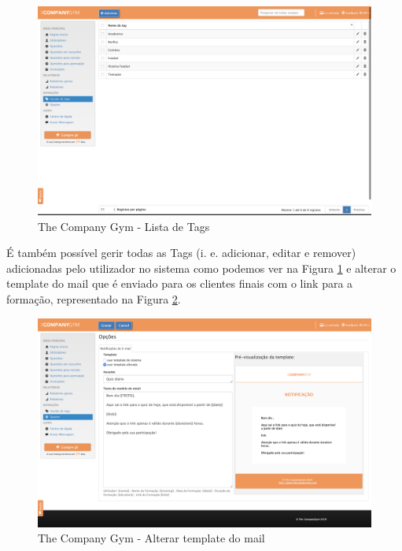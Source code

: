 \newpage


\begin{figure}[ht!]
	\begin{center}
		\includegraphics[width=1\textwidth]{img/tcg/tcg-tags.png}
		\caption{The Company Gym - Lista de Tags}
		\label{fig:tcg-tags}
	\end{center}
\end{figure}

É também possível gerir todas as Tags (i. e. adicionar, editar e remover) adicionadas pelo utilizador no sistema como podemos ver na Figura \ref{fig:tcg-tags} e alterar o template do mail que é enviado para os clientes finais com o link para a formação, representado na Figura \ref{fig:tcg-mail}. 

\begin{figure}[ht!]
	\begin{center}
		\includegraphics[width=1\textwidth]{img/tcg/tcg-mail.png}
		\caption{The Company Gym - Alterar template do mail}
		\label{fig:tcg-mail}
	\end{center}
\end{figure}

